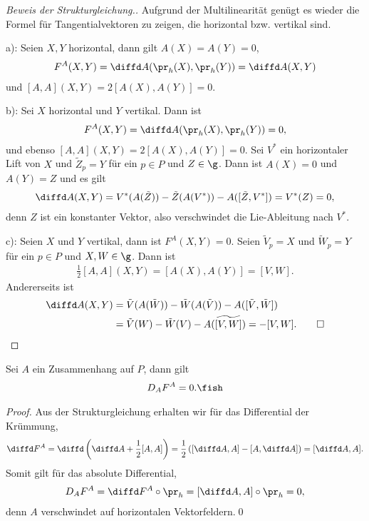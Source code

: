 \documentclass[%
	paper=a5,%
	fleqn,%
	DIV=18,%
	BCOR=0mm,
	fontsize=11pt,
	titlepage=false,%
	bibliography=totoc,
	DIV=18,%
	twoside=true,
	pdftitle=Riemannsche Geometrie,
	pdfauthor=Uwe Semmelmann,
	numbers=noendperiod]%
	{scrbook}
\begin{document}
\begin{proof}[Beweis der Strukturgleichung.]
Aufgrund der Multilinearität genügt es wieder die Formel für Tangentialvektoren
zu zeigen, die horizontal bzw. vertikal sind.

a): Seien $X,Y$ horizontal, dann gilt $A(X) = A(Y) = 0$,
\begin{align*}
F^A(X,Y) = \diffd A(\pr_h(X),\pr_h(Y)) = \diffd
A(X,Y)
\end{align*}
und $[A,A](X,Y) = 2[A(X),A(Y)] =  0$.

b): Sei $X$ horizontal und $Y$ vertikal. Dann ist
\begin{align*}
F^A(X,Y) = \diffd A(\pr_h(X),\pr_h(Y)) = 0,
\end{align*}
und ebenso $[A,A](X,Y) = 2[A(X),A(Y)] = 0$.
Sei $V^*$ ein horizontaler Lift von $X$ und $\tilde{Z}_p = Y$ für ein $p\in P$
und $Z\in\g$. Dann ist $A(X) = 0$ und $A(Y) = Z$ und es gilt
\begin{align*}
\diffd A(X,Y) = V^*(A(\tilde{Z})) - \tilde{Z}(A(V^*)) - A([\tilde{Z},V^*])
= V^*(Z) = 0, 
\end{align*}
denn $Z$ ist ein konstanter Vektor, also verschwindet die Lie-Ableitung nach
$V^*$.

c): Seien $X$ und $Y$ vertikal, dann ist $F^A(X,Y) = 0$. Seien $\tilde{V}_p = X$
und $\tilde{W}_p = Y$ für ein $p\in P$ und $X,W\in\g$. Dann ist
\begin{align*}
\frac{1}{2}[A,A](X,Y) = [A(X),A(Y)] = [V,W].
\end{align*}
Andererseits ist
\begin{align*}
\diffd A(X,Y) &= \tilde{V}(A(\tilde{W})) - \tilde{W}(A(\tilde{V})) -
A([\tilde{V},\tilde{W}])\\
&= \tilde{V}(W) - \tilde{W}(V)
- A(\widetilde{[V,W]})
= -[V,W].\qed 
\end{align*}
\end{proof}



\begin{prop}
Sei $A$ ein Zusammenhang auf $P$, dann gilt
\begin{align*}
D_A F^A = 0.\fish
\end{align*}
\end{prop}

\begin{proof}
Aus der Strukturgleichung erhalten wir für das Differential der Krümmung,
\begin{align*}
\diffd F^A = \diffd\left(\diffd A + \frac{1}{2}[A,A]\right)
= \frac{1}{2}\left([\diffd A,A] - [A,\diffd A] \right)
= [\diffd A,A].
\end{align*}
Somit gilt für das absolute Differential,
\begin{align*}
D_A F^A = \diffd F^A\circ\pr_h = [\diffd A,A]\circ\pr_h = 0, 
\end{align*}
denn $A$ verschwindet auf horizontalen Vektorfeldern.\qed
\end{proof}
\end{document}
